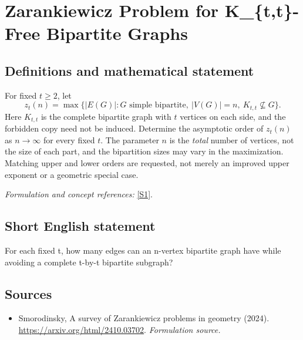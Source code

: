 \documentclass[11pt]{article}
\begin{document}
\section*{\texorpdfstring{Zarankiewicz Problem for K\_\{t,t\}-Free Bipartite Graphs}{Zarankiewicz Problem for K\_\{t,t\}-Free Bipartite Graphs}}\label{30006824}
\subsection{Definitions and mathematical statement}
For fixed $t\ge2$, let
\[
 z_t(n)=\max\{|E(G)|:G\text{ simple bipartite},\ |V(G)|=n,
 \ K_{t,t}\not\subseteq G\}.
\]
Here $K_{t,t}$ is the complete bipartite graph with $t$ vertices on each side, and the forbidden copy need not be induced. Determine the asymptotic order of $z_t(n)$ as $n\to\infty$ for every fixed $t$. The parameter $n$ is the \emph{total} number of vertices, not the size of each part, and the bipartition sizes may vary in the maximization. Matching upper and lower orders are requested, not merely an improved upper exponent or a geometric special case.
\par\smallskip\textit{Formulation and concept references:} \href{https://arxiv.org/html/2410.03702}{[S1]}.

\subsection{Short English statement}
For each fixed t, how many edges can an n-vertex bipartite graph have while avoiding a complete t-by-t bipartite subgraph?
\subsection{Sources}
\begin{itemize}
\item[S1]Smorodinsky, A survey of Zarankiewicz problems in geometry (2024).
\url{https://arxiv.org/html/2410.03702}.
\textit{Formulation source.}
\end{itemize}
\end{document}
